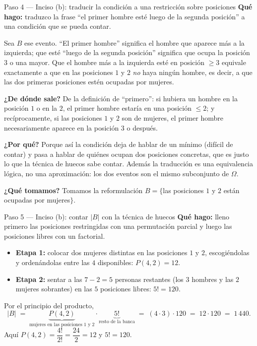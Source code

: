 \documentclass[11pt]{article}
\begin{document}
\begin{sol}
\begin{paso}{Paso 4 --- Inciso (b): traducir la condici\'on a una restricci\'on sobre posiciones}
\textbf{Qu\'e hago:} traduzco la frase ``el primer hombre est\'e luego de la segunda posici\'on'' a una condici\'on que se pueda contar.

Sea $B$ ese evento. ``El primer hombre'' significa el hombre que aparece m\'as a la izquierda; que est\'e ``luego de la segunda posici\'on'' significa que ocupa la posici\'on $3$ o una mayor. Que el hombre m\'as a la izquierda est\'e en posici\'on $\ge 3$ equivale exactamente a que en las posiciones $1$ y $2$ \emph{no} haya ning\'un hombre, es decir, a que las dos primeras posiciones est\'en ocupadas por mujeres.

\textbf{¿De d\'onde sale?} De la definici\'on de ``primero'': si hubiera un hombre en la posici\'on $1$ o en la $2$, el primer hombre estar\'ia en una posici\'on $\le 2$; y rec\'iprocamente, si las posiciones $1$ y $2$ son de mujeres, el primer hombre necesariamente aparece en la posici\'on $3$ o despu\'es.

\textbf{¿Por qu\'e?} Porque as\'i la condici\'on deja de hablar de un m\'inimo (dif\'icil de contar) y pasa a hablar de qui\'enes ocupan dos posiciones concretas, que es justo lo que la t\'ecnica de huecos sabe contar. Adem\'as la traducci\'on es una equivalencia l\'ogica, no una aproximaci\'on: los dos eventos son el mismo subconjunto de $\Omega$.

\textbf{¿Qu\'e tomamos?} Tomamos la reformulaci\'on $B=\{$las posiciones $1$ y $2$ est\'an ocupadas por mujeres$\}$.
\end{paso}

\begin{paso}{Paso 5 --- Inciso (b): contar $|B|$ con la t\'ecnica de huecos}
\textbf{Qu\'e hago:} lleno primero las posiciones restringidas con una permutaci\'on parcial y luego las posiciones libres con un factorial.

\begin{itemize}[leftmargin=*]
  \item \textbf{Etapa 1:} colocar dos mujeres distintas en las posiciones $1$ y $2$, escogi\'endolas y orden\'andolas entre las $4$ disponibles: $P(4,2)=12$.
  \item \textbf{Etapa 2:} sentar a las $7-2=5$ personas restantes (los $3$ hombres y las $2$ mujeres sobrantes) en las $5$ posiciones libres: $5!=120$.
\end{itemize}
Por el principio del producto,
\[
|B| \;=\; \underbrace{P(4,2)}_{\text{mujeres en las posiciones 1 y 2}}\cdot \underbrace{5!}_{\text{resto de la banca}}
\;=\; (4\cdot 3)\cdot 120 \;=\; 12\cdot 120 \;=\; 1\,440 .
\]
Aqu\'i $P(4,2)=\dfrac{4!}{2!}=\dfrac{24}{2}=12$ y $5!=120$.


\end{paso}
\end{sol}
\end{document}
